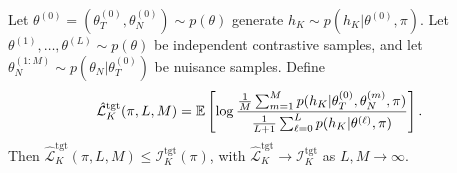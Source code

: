 \begin{theorem}
\label{thm:targeted_spce}
Let $\theta^{(0)} = (\theta_T^{(0)}, \theta_N^{(0)}) \sim p(\theta)$ generate $h_K \sim p(h_K|\theta^{(0)}, \pi)$. Let $\theta^{(1)},\ldots,\theta^{(L)} \sim p(\theta)$ be independent contrastive samples, and let $\theta_N^{(1:M)} \sim p(\theta_N|\theta_T^{(0)})$ be nuisance samples. Define
\begin{equation}
\hat{\mathcal{L}}_K^{\text{tgt}}(\pi, L, M) = \operatorname{\mathbb{E}}\left[\log \frac{\frac{1}{M}\sum_{m=1}^{M} p(h_K|\theta_T^{(0)}, \theta_N^{(m)}, \pi)}{\frac{1}{L+1}\sum_{\ell=0}^{L} p(h_K|\theta^{(\ell)}, \pi)}\right].
\end{equation}
Then $\hat{\mathcal{L}}_K^{\text{tgt}}(\pi, L, M) \leq \mathcal{I}_K^{\text{tgt}}(\pi)$, with $\hat{\mathcal{L}}_K^{\text{tgt}} \to \mathcal{I}_K^{\text{tgt}}$ as $L, M \to \infty$.
\end{theorem}

